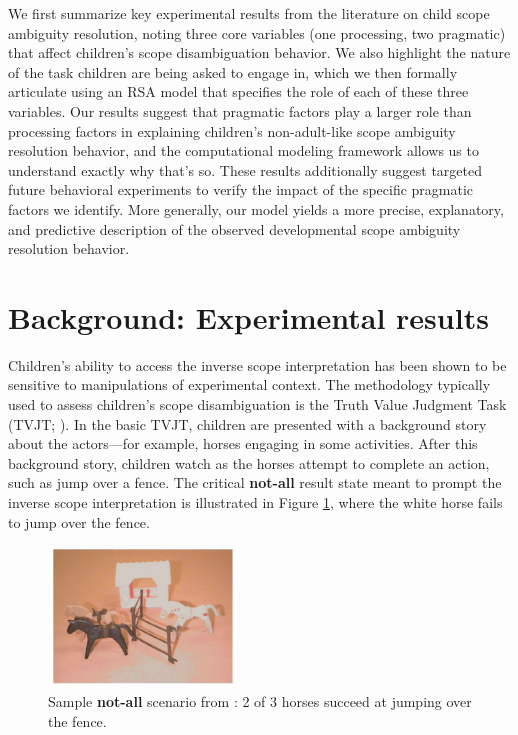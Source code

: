 \documentclass[10pt,a4paper]{article}
\newcommand{\gcs}[1]{\textcolor{blue}{[gcs: #1]}}
\newcommand{\lsp}[1]{\textcolor{violet}{[lsp: #1]}}
\begin{document}
We first summarize key experimental results from the literature on child scope ambiguity resolution, noting three core variables (one processing, two pragmatic) that affect children's scope disambiguation behavior. We also highlight the nature of the task children are being asked to engage in, 
which we then formally articulate using an RSA model that specifies the role of each of these three variables.
Our results suggest that pragmatic factors play a larger role than processing factors in explaining children's non-adult-like scope ambiguity resolution behavior, 
and the computational modeling framework allows us to understand exactly why that's so. %
These results additionally suggest targeted future behavioral experiments to verify the impact of the specific pragmatic factors we identify.  
More generally, our model yields a more precise, explanatory, and predictive description of the observed developmental scope ambiguity resolution behavior.


\section{Background: Experimental results}

Children's ability to access the inverse scope interpretation has been shown to be sensitive to manipulations of experimental context.
The methodology typically used to assess children's scope disambiguation is the Truth Value Judgment Task (TVJT; ).  In the basic TVJT, children are presented with a background story about the actors---for example, horses engaging in some activities.  After this background story, children watch as the horses attempt to complete an action, such as jump over a fence. 
The critical \textbf{not-all} result state meant to prompt the inverse scope interpretation is illustrated in Figure \ref{fig:horse}, where the white horse fails to jump over the fence. 

\begin{figure}[!ht]
\begin{center}
\includegraphics[width=50mm,scale=0.5]{musolidz_horses_pic.JPG}
\caption{Sample \textbf{not-all} scenario from : 2 of 3 horses succeed at jumping over the fence.}
\label{fig:horse}
\end{center}
\end{figure}
\end{document}
